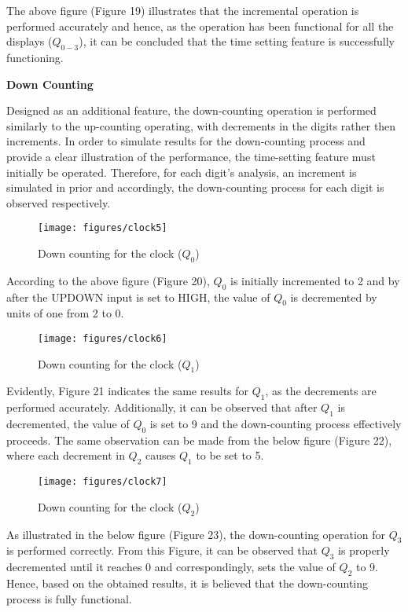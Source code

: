 \documentclass[12pt,a4paper]{article}
\begin{document}
	\noindent The above figure (Figure 19) illustrates that the incremental operation is performed accurately and hence, as the operation has been functional for all the displays ($Q_{0-3}$), it can be concluded that the time setting feature is successfully functioning.
	
	\vspace{0.2cm}
	\noindent \textbf{Down Counting}
	\vspace{0.2cm}
	
	\noindent Designed as an additional feature, the down-counting operation is performed similarly to the up-counting operating, with decrements in the digits rather then increments. In order to simulate results for the down-counting process and provide a clear illustration of the performance, the time-setting feature must initially be operated. Therefore, for each digit's analysis, an increment is simulated in prior and accordingly, the down-counting process for each digit is observed respectively.
	
	\begin{figure}[H]
		\centering
		\texttt{[image: figures/clock5]}
		\caption{Down counting for the clock ($Q_{0}$)}
	\end{figure}

	\noindent According to the above figure (Figure 20), $Q_{0}$ is initially incremented to 2 and by after the UPDOWN input is set to HIGH, the value of $Q_{0}$ is decremented by units of one from 2 to 0.

	\begin{figure}[H]
		\centering
		\texttt{[image: figures/clock6]}
		\caption{Down counting for the clock ($Q_{1}$)}
	\end{figure}

	\noindent Evidently, Figure 21 indicates the same results for $Q_{1}$, as the decrements are performed accurately. Additionally, it can be observed that after $Q_{1}$ is decremented, the value of $Q_{0}$ is set to 9 and the down-counting process effectively proceeds. The same observation can be made from the below figure (Figure 22), where each decrement in $Q_{2}$ causes $Q_{1}$ to be set to 5. 
	
	\begin{figure}[H]
		\centering
		\texttt{[image: figures/clock7]}
		\caption{Down counting for the clock ($Q_{2}$)}
	\end{figure}

	\noindent As illustrated in the below figure (Figure 23), the down-counting operation for $Q_{3}$ is performed correctly. From this Figure, it can be observed that $Q_{3}$ is properly decremented until it reaches 0 and correspondingly, sets the value of $Q_{2}$ to 9. Hence, based on the obtained results, it is believed that the down-counting process is fully functional.
	
\end{document}
